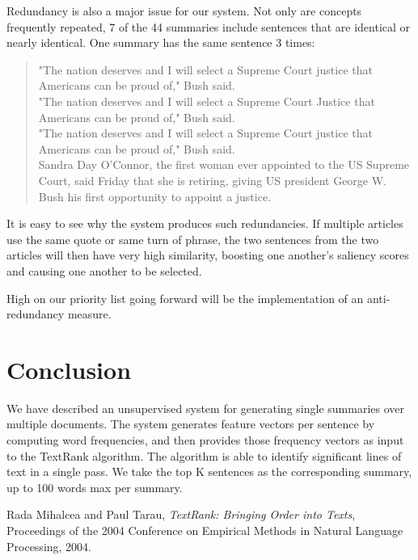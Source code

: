 \documentclass[11pt]{article}
\begin{document}
Redundancy is also a major issue for our system. Not only are concepts frequently repeated, 7 of the 44 summaries include sentences that are identical or nearly identical. One summary has the same sentence 3 times:\\

\begin{quote}
"The nation deserves and I will select a Supreme Court justice that Americans can be proud of," Bush said.\\
"The nation deserves and I will select a Supreme Court Justice that Americans can be proud of," Bush said.\\
"The nation deserves and I will select a Supreme Court justice that Americans can be proud of," Bush said.\\
Sandra Day O'Connor, the first  woman ever appointed to the US Supreme Court, said Friday that she is retiring, giving US president George W. Bush his first  opportunity to appoint a justice.
\end{quote}

It is easy to see why the system produces such redundancies. If multiple articles use the same quote or same turn of phrase, the two sentences from the two articles will then have very high similarity, boosting one another's saliency scores and causing one another to be selected.

High on our priority list going forward will be the implementation of an anti-redundancy measure.


\section{Conclusion}
 We have described an unsupervised system for generating single summaries over multiple documents. The system generates feature vectors per sentence by computing word frequencies, and then provides those frequency vectors as input to the TextRank algorithm. The algorithm is able to identify significant lines of text in a single pass. We take the top K sentences as the corresponding summary, up to 100 words max per summary.

%
%

\begin{thebibliography}{}

	Rada Mihalcea and Paul Tarau,
	\textit{TextRank: Bringing Order into Texts},
	Proceedings of the 2004 Conference on Empirical Methods in Natural Language Processing,
	2004.

\end{thebibliography}
\end{document}
